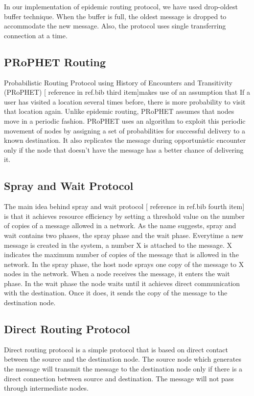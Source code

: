 \documentclass[conference]{IEEEtran}
\begin{document}
In our implementation of epidemic routing protocol, we have used drop-oldest buffer technique. When the buffer is full, the oldest message is dropped to accommodate the new message. Also, the protocol uses single transferring connection at a time. 

\subsection{PRoPHET Routing}
Probabilistic Routing Protocol using History of Encounters and Transitivity (PRoPHET) [ reference in ref.bib third item]makes use of an assumption that If a user has visited a location several times before, there is more probability to visit that location again. Unlike epidemic routing, PRoPHET assumes that nodes move in a periodic fashion. PRoPHET uses an algorithm to exploit this periodic movement of nodes by assigning a set of probabilities for successful delivery to a known destination. It also replicates the message during opportunistic encounter only if the node that doesn't have the message has a better chance of delivering it.     

\subsection{Spray and Wait Protocol}
The main idea behind spray and wait protocol [ reference in ref.bib fourth item] is that it achieves resource efficiency by setting a threshold value on the number of copies of a message allowed in a network.
As the name suggests, spray and wait contains two phases, the spray phase and the wait phase. Everytime a new message is created in the system, a number X is attached to the message. X indicates the maximum number of copies of the message that is allowed in the network. In the spray phase, the host node sprays one copy of the message to X nodes in the network. When a node receives the message, it enters the wait phase. In the wait phase the node waits until it achieves direct communication with the destination. Once it does, it sends the copy of the message to the destination node.   

\subsection{Direct Routing Protocol}
Direct routing protocol is a simple protocol that is based on direct contact between the source and the destination node. The source node which generates the message will transmit the message to the destination node only if there is a direct connection between source and destination. The message will not pass through intermediate nodes. 
\end{document}
